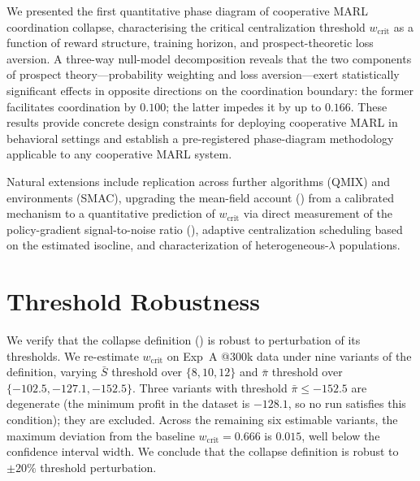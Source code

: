 \documentclass[11pt]{article}
\newcommand{\wcrit}{w_{\mathrm{crit}}}
\begin{document}
We presented the first quantitative phase diagram of cooperative MARL
coordination collapse, characterising the critical centralization threshold
$\wcrit$ as a function of reward structure, training horizon, and
prospect-theoretic loss aversion.
A three-way null-model decomposition reveals that the two components of
prospect theory---probability weighting and loss aversion---exert
statistically significant effects in opposite directions on the
coordination boundary: the former facilitates coordination by $0.100$;
the latter impedes it by up to $0.166$.
These results provide concrete design constraints for deploying cooperative
MARL in behavioral settings and establish a pre-registered phase-diagram
methodology applicable to any cooperative MARL system.

Natural extensions include replication across further algorithms (QMIX) and
environments (SMAC), upgrading the mean-field account
() from a calibrated mechanism to a quantitative
prediction of $\wcrit$ via direct measurement of the policy-gradient
signal-to-noise ratio (), adaptive centralization
scheduling based on the estimated isocline, and characterization of
heterogeneous-$\lambda$ populations.



\appendix

\section{Threshold Robustness}
\label{sec:appendix_robustness}

We verify that the collapse definition () is robust to
perturbation of its thresholds.
We re-estimate $\wcrit$ on Exp~A @300k data under nine variants of the
definition, varying $\bar{S}$ threshold over $\{8, 10, 12\}$ and
$\bar{\pi}$ threshold over $\{-102.5, -127.1, -152.5\}$.
Three variants with threshold $\bar{\pi} \leq -152.5$ are degenerate
(the minimum profit in the dataset is $-128.1$, so no run satisfies
this condition); they are excluded.
Across the remaining six estimable variants, the maximum deviation from
the baseline $\wcrit = 0.666$ is $0.015$, well below the confidence
interval width.
We conclude that the collapse definition is robust to $\pm 20\%$ threshold
perturbation.
\end{document}
